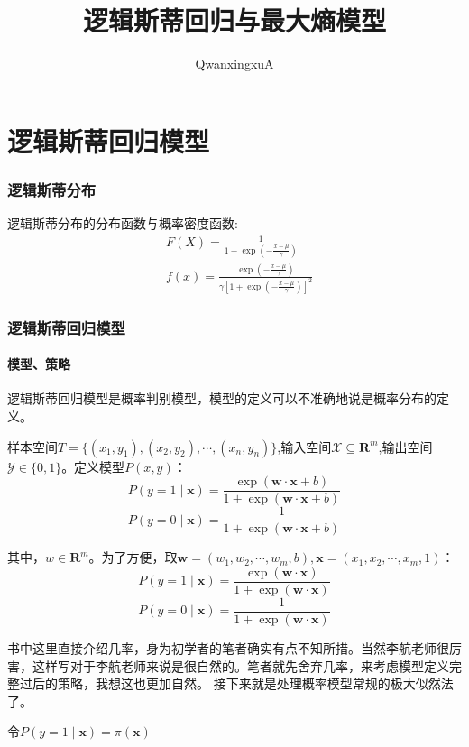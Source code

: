 \documentclass{article}
\title{逻辑斯蒂回归与最大熵模型}
\author{QwanxingxuA}
\begin{document}
\maketitle
\part{逻辑斯蒂回归模型}
    \section{逻辑斯蒂分布}
        逻辑斯蒂分布的分布函数与概率密度函数:
        \begin{align*}
            &F(X)=\frac{1}{1+\exp(-\frac{x-\mu }{\gamma })} \\
            &f(x)=\frac{\exp(-\frac{x-\mu}{\gamma})}{\gamma\left[1+\exp(-\frac{x-\mu}{\gamma})\right]^2}
        \end{align*}
    \section{逻辑斯蒂回归模型}
        \subsection{模型、策略}
        逻辑斯蒂回归模型是概率判别模型，模型的定义可以不准确地说是概率分布的定义。

        样本空间$T=\{(x_1,y_1),(x_2,y_2),\cdots,(x_n,y_n)\}$,输入空间$\mathcal{X}\subseteq \mathbf{R}^m$,输出空间$\mathcal{Y}\in\{0,1\}$。定义模型$P(x,y)$：
        \[P(y=1\mid\boldsymbol{x})=\frac{\exp(\boldsymbol{w}\cdot\boldsymbol{x}+b)}{1+\exp(\boldsymbol{w}\cdot\boldsymbol{x}+b)}\]
        \[P(y=0\mid\boldsymbol{x})=\frac{1}{1+\exp(\boldsymbol{w}\cdot\boldsymbol{x}+b)}\]
        
        其中，$w\in \mathbf{R}^m $。为了方便，取$\boldsymbol{w}=(w_1,w_2,\cdots,w_m,b),\boldsymbol{x}=(x_1,x_2,\cdots,x_m,1)$：
         \[P(y=1\mid\boldsymbol{x})=\frac{\exp(\boldsymbol{w}\cdot\boldsymbol{x})}{1+\exp(\boldsymbol{w}\cdot\boldsymbol{x})}\]
        \[P(y=0\mid\boldsymbol{x})=\frac{1}{1+\exp(\boldsymbol{w}\cdot\boldsymbol{x})}\]

        书中这里直接介绍几率，身为初学者的笔者确实有点不知所措。当然李航老师很厉害，这样写对于李航老师来说是很自然的。笔者就先舍弃几率，来考虑模型定义完整过后的策略，我想这也更加自然。
        接下来就是处理概率模型常规的极大似然法了。
        
        令$P(y=1\mid\boldsymbol{x})=\pi(\boldsymbol{x})$
\end{document}
